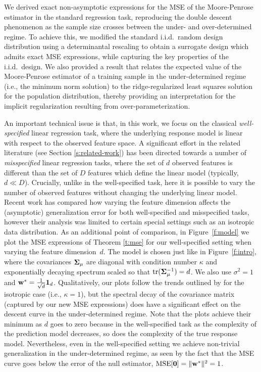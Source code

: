 \documentclass[11pt]{article}
\begin{document}
We derived exact non-asymptotic expressions for the MSE of the
Moore-Penrose estimator in the standard regression task, reproducing
the double descent phenomenon as the sample size crosses between the
under- and over-determined regime. To achieve this, we modified the
standard i.i.d.~random design distribution using a determinantal
rescaling to obtain a surrogate design which admits exact MSE expressions,
while capturing the key properties of the i.i.d.~design. We
also provided a result that relates the expected value of the
Moore-Penrose estimator of a training sample in the under-determined regime (i.e., the
minimum norm solution) to the ridge-regularized least squares solution
for the population distribution, thereby providing an interpretation for the
implicit regularization resulting from over-parameterization.


An important technical issue is that, in this work, we focus on the classical \emph{well-specified}
linear regression task, where the underlying response model is linear
with respect to the observed feature space. A significant effort in
the related literature (see Section \ref{s:related-work}) has been
directed towards a number of \emph{misspecified} linear regression
tasks, where the set of $d$ observed features is different than the
set of $D$ features which define the linear model (typically, $d\ll
D$). Crucially, unlike in the well-specified task, here it is possible
to vary the number of observed features without changing the
underlying linear model. 
Recent work \cite{HMRT19_TR} has compared how
varying the feature dimension affects the (asymptotic) generalization
error for both well-specified and misspecified tasks, however their
analysis was limited to certain special settings such as an
isotropic data distribution. As an additional 
point of comparison, in Figure~\ref{f:model} we plot the MSE
expressions of Theorem \ref{t:mse} for our well-specified setting when varying the
feature dimension~$d$. The model is chosen just like in
Figure~\ref{f:intro}, where the covariances $\mathbf{\Sigma}_\mu$ are diagonal
with condition number $\kappa$ and exponentially decaying spectrum
scaled so that $\mathrm{tr}(\mathbf{\Sigma}_\mu^{-1})=d$. We also use $\sigma^2=1$ and
$\mathbf w^*=\frac1{\sqrt{d}}\mathbf 1_d$. Qualitatively, our plots follow the
trends outlined by \cite{HMRT19_TR} for the isotropic case (i.e., $\kappa=1$), 
but the spectral decay of the covariance matrix (captured by our new
MSE expressions) does have a significant effect on the descent curve
in the under-determined regime. Note that the plots achieve their
minimum as $d$ goes to zero because in the well-specified task as
the complexity of the prediction model decreases, so does the complexity of the
true response model. Nevertheless, even in the well-specified setting
we achieve non-trivial generalization in the under-determined regime,
as seen by the fact that the MSE curve goes below the error of the
null estimator, $\mathrm{MSE}[\mathbf 0]=\|\mathbf w^*\|^2=1$.
\end{document}

